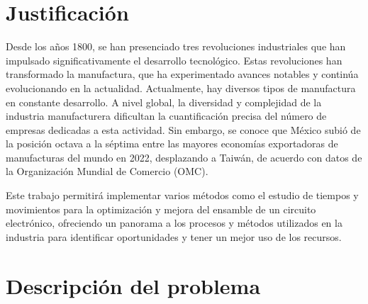     \section{Justificación}
    
    Desde los años 1800, se han presenciado tres revoluciones industriales que han impulsado significativamente el desarrollo tecnológico. \cite{peemans1992revoluciones}Estas revoluciones han transformado la manufactura, que ha experimentado avances notables y continúa evolucionando en la actualidad. Actualmente, hay diversos tipos de manufactura en constante desarrollo.
    A nivel global, la diversidad y complejidad de la industria manufacturera dificultan la cuantificación precisa del número de empresas dedicadas a esta actividad. Sin embargo, se conoce que México subió de la posición octava a la séptima entre las mayores economías exportadoras de manufacturas del mundo en 2022, desplazando a Taiwán, de acuerdo con datos de la Organización Mundial de Comercio (OMC).\cite{ELECONOMISTA}
    
    Este trabajo permitirá implementar varios métodos como el estudio de tiempos y movimientos para la optimización y mejora del ensamble de un circuito electrónico, ofreciendo un panorama a los procesos y métodos utilizados en la industria para identificar oportunidades y tener un mejor uso de los recursos. 
    \section{Descripción del problema}
    
